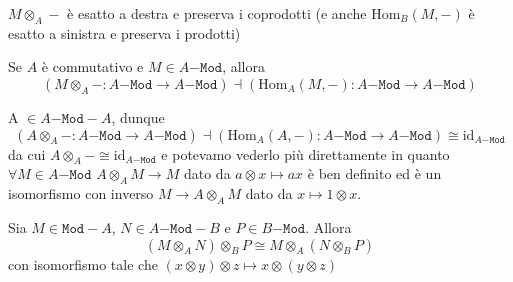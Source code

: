 \begin{corollary}{}
    \(M \otimes_A -\) è esatto a destra e preserva i coprodotti (e anche
    \(\mathrm{Hom}_B{(M, -)}\) è esatto a sinistra e preserva i prodotti)
\end{corollary}
\begin{corollary}{}\label{cor:mod_tens}
    Se \(A\) è commutativo e \(M \in A\mathtt{-Mod}\), allora 
    \[
        (M \otimes_A - : A\mathtt{-Mod} \to A\mathtt{-Mod}) \dashv
        {(\mathrm{Hom}_A{(M, -)} : A\mathtt{-Mod} \to A\mathtt{-Mod})}
    \]
\end{corollary}

\begin{remark}{}
    A \(\in A\mathtt{-Mod-}A\), dunque 
    \[
      {(A \otimes_A - : A\mathtt{-Mod} \to A\mathtt{-Mod})} \dashv
      {(\mathrm{Hom}_A{(A,-)}: A\mathtt{-Mod} \to A\mathtt{-Mod})} \cong
      \mathrm{id}_{A\mathtt{-Mod}} 
    \]
    da cui \(A \otimes_A - \cong \mathrm{id}_{A\mathtt{-Mod}}\) e potevamo
    vederlo più direttamente in quanto \(\forall M \in A\mathtt{-Mod}\) \(A
    \otimes_A M \to M\) dato da \(a \otimes x \mapsto ax\) è ben definito ed è
    un isomorfismo con inverso \(M \to A \otimes_A M\) dato da \(x \mapsto 1
    \otimes x\).
\end{remark}

\begin{proposition}{}
    Sia \(M \in \mathtt{Mod-}A\), \(N \in A\mathtt{-Mod-}B\) e \(P \in
    B\mathtt{-Mod}\). Allora 
    \[
      {(M \otimes_A N)}\otimes_B P \cong M \otimes_A {(N \otimes_B P)}
    \]
    con isomorfismo tale che \({(x \otimes y)} \otimes z \mapsto x \otimes {(y
    \otimes z)}\) 
\end{proposition}

